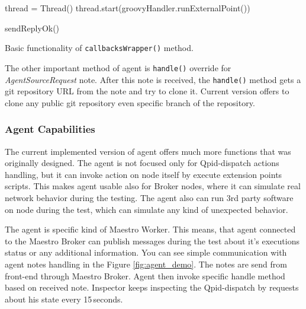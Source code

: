 \begin{center}
	\begin{algorithm}[H]
		\LinesNumbered
		\DontPrintSemicolon



		\var thread = Thread()\;
		thread.start(groovyHandler.runExternalPoint())\;

		sendReplyOk()\;

		 \caption{Basic functionality of \texttt{callbacksWrapper()} method. }
		 \label{alg:agent_note_handle}
	\end{algorithm}
\end{center}

The other important method of agent is \texttt{handle()} override for \emph{AgentSourceRequest} note. After this note is received, the \texttt{handle()} method gets a git repository URL from the note and try to clone it. Current version offers to clone any public git repository even specific branch of the repository.

\subsubsection*{Agent Capabilities}
\label{Agent Capabilities}
The current implemented version of agent offers much more functions that was originally designed. The agent is not focused only for Qpid-dispatch actions handling, but it can invoke action on node itself by execute extension points scripts. This makes agent usable also for Broker nodes, where it can simulate real network behavior during the testing. The agent also can run 3rd party software on node during the test, which can simulate any kind of unexpected behavior.

The agent is specific kind of Maestro Worker. This means, that agent connected to the Maestro Broker can publish messages during the test about it's executions status or any additional information. You can see simple communication with agent notes handling in the Figure \ref{fig:agent_demo}. The notes are send from front-end through Maestro Broker. Agent then invoke specific handle method based on received note. Inspector keeps inspecting the Qpid-dispatch by requests about his state every 15\,seconds.

